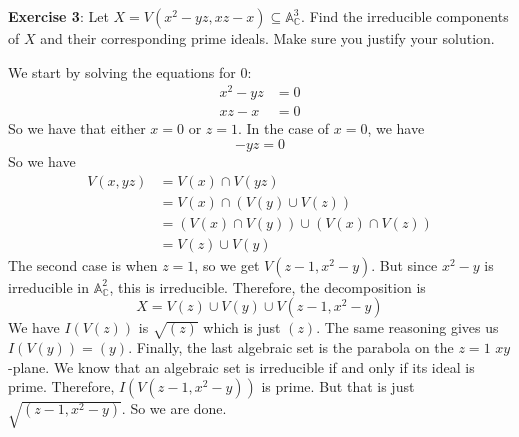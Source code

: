 \documentclass{article}
\begin{document}
\textbf{Exercise 3}: Let $X = V(x^{2} - yz, xz - x) \subseteq \mathbb{A}_{\mathbb{C}}^{3}$. Find the irreducible components of $X$ and their corresponding prime ideals. Make sure you justify your solution.
    \begin{answer}
        We start by solving the equations for $0$:
            \begin{align*}
                x^{2} - yz &= 0 \\
                xz - x     &= 0   
            \end{align*}
        So we have that either $x = 0$ or $z = 1$. In the case of $x = 0$, we have
            \begin{equation*}
                -yz = 0
            \end{equation*}
        So we have
            \begin{align*}
                V(x, yz) &= V(x) \cap V(yz) \\
                &= V(x) \cap (V(y) \cup V(z)) \\
                &= (V(x) \cap V(y)) \cup (V(x) \cap  V(z)) \\
                &= V(z) \cup V(y)
            \end{align*}
        The second case is when $z = 1$, so we get $V(z - 1, x^{2} - y)$. But since $x^{2} - y$ is irreducible in $\mathbb{A}_{\mathbb{C}}^{2}$, this is irreducible. Therefore, the decomposition is
            \begin{equation*}
                X = V(z) \cup V(y) \cup V(z - 1, x^{2} - y)
            \end{equation*}
        We have $I(V(z))$ is $\sqrt{(z)}$ which is just $(z)$. The same reasoning gives us $I(V(y)) = (y)$. Finally, the last algebraic set is the parabola on the $z = 1$ $xy$-plane. We know that an algebraic set is irreducible if and only if its ideal is prime. Therefore, $I(V(z - 1, x^{2} - y))$ is prime. But that is just $\sqrt{(z - 1, x^{2} - y)}$. So we are done.
    \end{answer}
\end{document}
